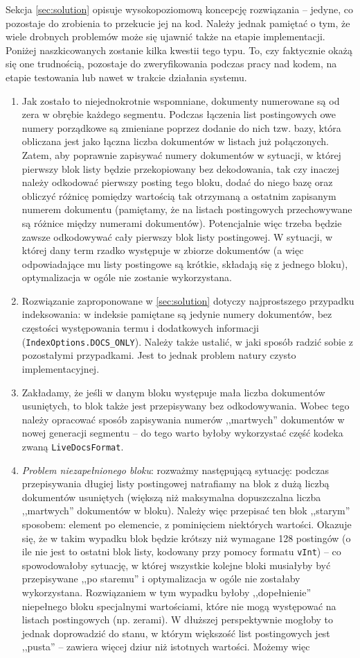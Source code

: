 Sekcja \ref{sec:solution} opisuje wysokopoziomową koncepcję rozwiązania -- jedyne, co pozostaje do zrobienia to przekucie jej na kod. Należy jednak pamiętać o tym, że wiele drobnych problemów może się ujawnić także na etapie implementacji. Poniżej naszkicowanych zostanie kilka kwestii tego typu. To, czy faktycznie okażą się one trudnością, pozostaje do zweryfikowania podczas pracy nad kodem, na etapie testowania lub nawet w trakcie działania systemu. 
\begin{enumerate}
 \item Jak zostało to niejednokrotnie wspomniane, dokumenty numerowane są od zera w obrębie każdego segmentu. Podczas łączenia list postingowych owe numery porządkowe są zmieniane poprzez dodanie do nich tzw. bazy, która obliczana jest jako łączna liczba dokumentów w listach już połączonych. Zatem, aby poprawnie zapisywać numery dokumentów w sytuacji, w której pierwszy blok listy będzie przekopiowany bez dekodowania, tak czy inaczej należy odkodować pierwszy posting tego bloku, dodać do niego bazę oraz obliczyć różnicę pomiędzy wartością tak otrzymaną a ostatnim zapisanym numerem dokumentu (pamiętamy, że na listach postingowych przechowywane są różnice między numerami dokumentów). Potencjalnie więc trzeba będzie zawsze odkodowywać cały pierwszy blok listy postingowej. W sytuacji, w której dany term rzadko występuje w zbiorze dokumentów (a więc odpowiadające mu listy postingowe są krótkie, składają się z jednego bloku), optymalizacja w ogóle nie zostanie wykorzystana.
 \item Rozwiązanie zaproponowane w \ref{sec:solution} dotyczy najprostszego przypadku indeksowania: w  indeksie pamiętane są jedynie numery dokumentów, bez częstości występowania termu i dodatkowych informacji (\texttt{IndexOptions.DOCS\_ONLY}). Należy także ustalić, w jaki sposób radzić sobie z pozostałymi przypadkami. Jest to jednak problem natury czysto implementacyjnej.
 \item Zakładamy, że jeśli w danym bloku występuje mała liczba dokumentów usuniętych, to blok także jest przepisywany bez odkodowywania. Wobec tego należy opracować sposób zapisywania numerów ,,martwych'' dokumentów w nowej generacji segmentu -- do tego warto byłoby wykorzystać część kodeka zwaną \texttt{LiveDocsFormat}.
 \item \emph{Problem niezapełnionego bloku}: rozważmy następującą sytuację: podczas przepisywania długiej listy postingowej natrafiamy na blok z dużą liczbą dokumentów usuniętych (większą niż maksymalna dopuszczalna liczba ,,martwych'' dokumentów w bloku). Należy więc przepisać ten blok ,,starym'' sposobem: element po elemencie, z pominięciem niektórych wartości. Okazuje się, że w takim wypadku blok będzie krótszy niż wymagane 128 postingów (o ile nie jest to ostatni blok listy, kodowany przy pomocy formatu \texttt{vInt}) -- co spowodowałoby sytuację, w której wszystkie kolejne bloki musiałyby być przepisywane ,,po staremu'' i optymalizacja w ogóle nie zostałaby wykorzystana. Rozwiązaniem w tym wypadku byłoby ,,dopełnienie'' niepełnego bloku specjalnymi wartościami, które nie mogą występować na listach postingowych (np. zerami). W dłuższej perspektywnie mogłoby to jednak doprowadzić do stanu, w którym większość list postingowych jest ,,pusta'' -- zawiera więcej dziur niż istotnych wartości. Możemy więc 

\end{enumerate}
